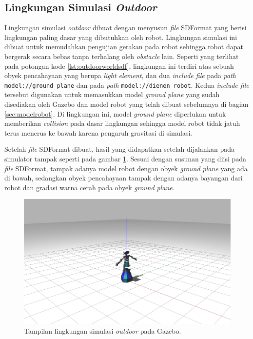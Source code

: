 \subsection{Lingkungan Simulasi \emph{Outdoor}}
\label{subsec:lingkunganoutdoor}

Lingkungan simulasi \emph{outdoor} dibuat dengan menyusun \emph{file} SDFormat yang berisi lingkungan paling dasar yang dibutuhkan oleh robot.
Lingkungan simulasi ini dibuat untuk memudahkan pengujian gerakan pada robot sehingga robot dapat bergerak secara bebas tanpa terhalang oleh \emph{obstacle} lain.
Seperti yang terlihat pada potongan kode \ref{lst:outdoorworldsdf},
  lingkungan ini terdiri atas sebuah obyek pencahayaan yang berupa \emph{light element},
  dan dua \emph{include file} pada \emph{path} \lstinline{model://ground_plane} dan pada \emph{path} \lstinline{model://dienen_robot}.
Kedua \emph{include file} tersebut digunakan untuk memasukkan model \emph{ground plane} yang sudah disediakan oleh Gazebo dan model robot yang telah dibuat sebelumnya di bagian \ref{sec:modelrobot}.
Di lingkungan ini, model \emph{ground plane} diperlukan untuk memberikan \emph{collision} pada dasar lingkungan sehingga model robot tidak jatuh terus menerus ke bawah karena pengaruh gravitasi di simulasi.



Setelah \emph{file} SDFormat dibuat,
  hasil yang didapatkan setelah dijalankan pada simulator tampak seperti pada gambar \ref{fig:lingkunganoutdoor}.
Sesuai dengan susunan yang diisi pada \emph{file} SDFormat,
  tampak adanya model robot dengan obyek \emph{ground plane} yang ada di bawah,
  sedangkan obyek pencahayaan tampak dengan adanya bayangan dari robot dan gradasi warna cerah pada obyek \emph{ground plane}.

\begin{figure}[ht]
  \centering
  \includegraphics[scale=0.23]{gambar/lingkungan-outdoor.png}
  \caption{Tampilan lingkungan simulasi \emph{outdoor} pada Gazebo.}
  \label{fig:lingkunganoutdoor}
\end{figure}
